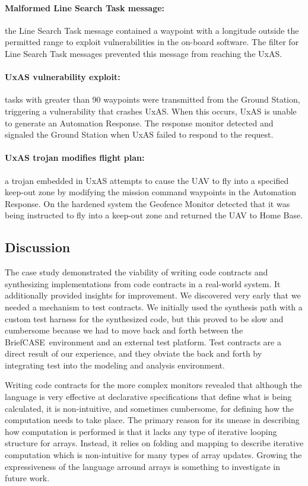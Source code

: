 \documentclass[global,twocolumn]{svjour}
\newcommand{\brfcs}{BriefCASE}
\begin{document}
\paragraph{Malformed Line Search Task message:\/}
%
the Line Search Task message contained a waypoint with a longitude outside the permitted range to exploit vulnerabilities in the on-board software.
%
The filter for Line Search Task messages prevented this message from reaching the UxAS.

\paragraph{UxAS vulnerability exploit:\/} tasks with greater than 90 waypoints were transmitted from the Ground Station, triggering a vulnerability that crashes UxAS.
%
When this occurs, UxAS is unable to generate an Automation Response.
%
The response monitor detected and signaled the Ground Station when UxAS failed to respond to the request.

\paragraph{UxAS trojan modifies flight plan:\/} a trojan embedded in UxAS attempts to cause the UAV to fly into a specified keep-out zone by modifying the mission command waypoints in the Automation Response.
%
On the hardened system the Geofence Monitor detected that it was being instructed to fly into a keep-out zone and returned the UAV to Home Base.


\subsection{Discussion}

The case study demonstrated the viability of writing code contracts and synthesizing implementations from code contracts in a real-world system.
%
It additionally provided insights for improvement.
%
We discovered very early that we needed a mechanism to test contracts.
%
We initially used the synthesis path with a custom test harness for the synthesized code, but this proved to be slow and cumbersome because we had to move back and forth between the \brfcs\ environment and an external test platform.
%
Test contracts are a direct result of our experience, and they obviate the back and forth by integrating test into the modeling and analysis environment.

Writing code contracts for the more complex monitors revealed that although the language is very effective at declarative specifications that define what is being calculated, it is non-intuitive, and sometimes cumbersome, for defining how the computation needs to take place.
%
The primary reason for its unease in describing how computation is performed is that it lacks any type of iterative looping structure for arrays.
%
Instead, it relies on folding and mapping to describe iterative computation which is non-intuitive for many types of array updates.
%
Growing the expressiveness of the language arround arrays is something to investigate in future work.
\end{document}
